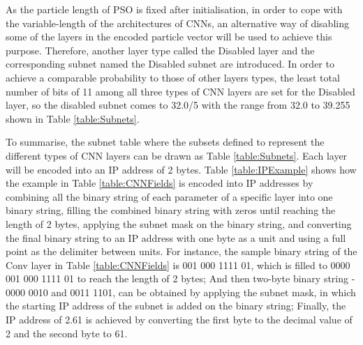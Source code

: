 \documentclass[conference]{IEEEtran}
\begin{document}
As the particle length of PSO is fixed after initialisation, in order to cope with the variable-length of the architectures of CNNs, an alternative way of disabling some of the layers in the encoded particle vector will be used to achieve this purpose. Therefore, another layer type called the Disabled layer and the corresponding subnet named the Disabled subnet are introduced. In order to achieve a comparable probability to those of other layers types, the least total number of bits of 11 among all three types of CNN layers are set for the Disabled layer, so the disabled subnet comes to 32.0/5 with the range from 32.0 to 39.255 shown in Table \ref{table:Subnets}. 


To summarise, the subnet table where the subsets defined to represent the different types of CNN layers can be drawn as Table \ref{table:Subnets}. Each layer will be encoded into an IP address of 2 bytes. Table \ref{table:IPExample} shows how the example in Table \ref{table:CNNFields} is encoded into IP addresses by combining all the binary string of each parameter of a specific layer into one binary string, filling the combined binary string with zeros until reaching the length of 2 bytes, applying the subnet mask on the binary string, and converting the final binary string to an IP address with one byte as a unit and using a full point as the delimiter between units. For instance, the sample binary string of the Conv layer in Table \ref{table:CNNFields} is 001 000 1111 01, which is filled to 0000 001 000 1111 01 to reach the length of 2 bytes; And then two-byte binary string - 0000 0010 and 0011 1101, can be obtained by applying the subnet mask, in which the starting IP address of the subnet is added on the binary string; Finally, the IP address of 2.61 is achieved by converting the first byte to the decimal value of 2 and the second byte to 61. 
\end{document}
